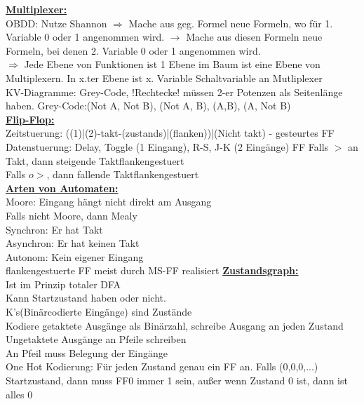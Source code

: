 \documentclass[11pt]{article}
\begin{document}
\begin{minipage}{0.3\textwidth}
\underline{\textbf{Multiplexer:}}\\
OBDD: Nutze Shannon
\phantom{ss} $\Rightarrow$ Mache aus geg. Formel neue Formeln, wo für 1. Variable 0 oder 1 angenommen wird. $\rightarrow$ Mache aus diesen Formeln neue Formeln, bei denen 2. Variable 0 oder 1 angenommen wird.\\
\phantom{ss} $\Rightarrow$ Jede Ebene von Funktionen ist 1 Ebene im Baum ist eine Ebene von Multiplexern. In x.ter Ebene ist x. Variable Schaltvariable an Mutliplexer\\
KV-Diagramme: Grey-Code, !Rechtecke! müssen 2-er Potenzen als Seitenlänge haben.
Grey-Code:(Not A, Not B), (Not A, B), (A,B), (A, Not B)\\
\underline{\textbf{Flip-Flop:}}\\
Zeitstuerung: ((1)|(2)-takt-(zustands)|(flanken))|(Nicht takt) - gesteurtes FF
Datenstuerung: Delay, Toggle (1 Eingang), R-S, J-K (2 Eingänge) FF
Falls $>$ an Takt, dann steigende Taktflankengestuert\\
Falls $o>$, dann fallende Taktflankengestuert\\
\underline{\textbf{Arten von Automaten:}}\\
Moore: Eingang hängt nicht direkt am Ausgang\\
Falls nicht Moore, dann Mealy\\
Synchron: Er hat Takt\\
Asynchron: Er hat keinen Takt\\
Autonom: Kein eigener Eingang\\
flankengestuerte FF meist durch MS-FF realisiert
\underline{\textbf{Zustandsgraph:}}\\
Ist im Prinzip totaler DFA\\
Kann Startzustand haben oder nicht.\\
K's(Binärcodierte Eingänge) sind Zustände\\
Kodiere getaktete Ausgänge als Binärzahl, schreibe Ausgang an jeden Zustand\\
Ungetaktete Ausgänge an Pfeile schreiben\\
An Pfeil muss Belegung der Eingänge\\
One Hot Kodierung:
Für jeden Zustand genau ein FF an. Falls (0,0,0,...) Startzustand, dann muss FF0 immer 1 sein, außer wenn Zustand 0 ist, dann ist alles 0


\end{minipage}%

\end{document}
